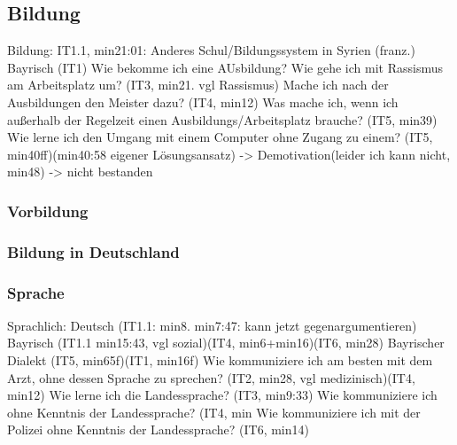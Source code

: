 
\subsection{Bildung}

Bildung:
    IT1.1, min21:01: Anderes Schul/Bildungssystem in Syrien (franz.)
    Bayrisch (IT1)
    Wie bekomme ich eine AUsbildung?
    Wie gehe ich mit Rassismus am Arbeitsplatz um? (IT3, min21. vgl Rassismus)
    Mache ich nach der Ausbildungen den Meister dazu? (IT4, min12)
    Was mache ich, wenn ich außerhalb der Regelzeit einen Ausbildungs/Arbeitsplatz brauche? (IT5, min39)
    Wie lerne ich den Umgang mit einem Computer ohne Zugang zu einem? (IT5, min40ff)(min40:58 eigener              Lösungsansatz) -> Demotivation(leider ich kann nicht, min48) -> nicht bestanden

\subsubsection{Vorbildung}
\subsubsection{Bildung in Deutschland}
\subsubsection{Sprache}
Sprachlich:
    Deutsch (IT1.1: min8. min7:47: kann jetzt gegenargumentieren)
    Bayrisch (IT1.1 min15:43, vgl sozial)(IT4, min6+min16)(IT6, min28)
            Bayrischer Dialekt (IT5, min65f)(IT1, min16f)
    Wie kommuniziere ich am besten mit dem Arzt, ohne dessen Sprache zu sprechen? (IT2, min28, vgl medizinisch)(IT4, min12)
    Wie lerne ich die Landessprache? (IT3, min9:33)
    Wie kommuniziere ich ohne Kenntnis der Landessprache? (IT4, min
    Wie kommuniziere ich mit der Polizei ohne Kenntnis der Landessprache? (IT6, min14)